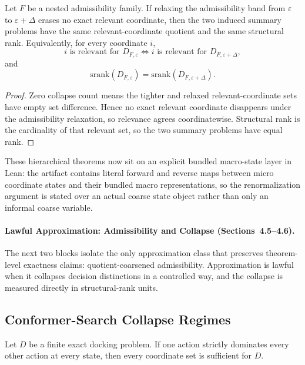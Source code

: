 \begin{theorem}\label{thm:renormalized-admissibility-equivalence}
Let $F$ be a nested admissibility family. If relaxing the admissibility band from $\varepsilon$ to $\varepsilon + \Delta$ erases no exact relevant coordinate, then the two induced summary problems have the same relevant-coordinate quotient and the same structural rank. Equivalently, for every coordinate $i$,
\[
i \text{ is relevant for } D_{F,\varepsilon}
\iff
i \text{ is relevant for } D_{F,\varepsilon+\Delta},
\]
and
\[
\mathrm{srank}(D_{F,\varepsilon}) = \mathrm{srank}(D_{F,\varepsilon+\Delta}).
\]
\end{theorem}

\begin{proof}
Zero collapse count means the tighter and relaxed relevant-coordinate sets have empty set difference. Hence no exact relevant coordinate disappears under the admissibility relaxation, so relevance agrees coordinatewise. Structural rank is the cardinality of that relevant set, so the two summary problems have equal rank.
\end{proof}

These hierarchical theorems now sit on an explicit bundled macro-state layer in Lean: the artifact contains literal forward and reverse maps between micro coordinate states and their bundled macro representations, so the renormalization argument is stated over an actual coarse state object rather than only an informal coarse variable.

\paragraph{Lawful Approximation: Admissibility and Collapse (Sections~4.5--4.6).}
The next two blocks isolate the only approximation class that preserves theorem-level exactness claims: quotient-coarsened admissibility. Approximation is lawful when it collapses decision distinctions in a controlled way, and the collapse is measured directly in structural-rank units.

\subsection{Conformer-Search Collapse Regimes}

\begin{theorem}\label{thm:strict-dominance-empty-sufficient}
Let $D$ be a finite exact docking problem. If one action strictly dominates every other action at every state, then every coordinate set is sufficient for $D$.
\end{theorem}

